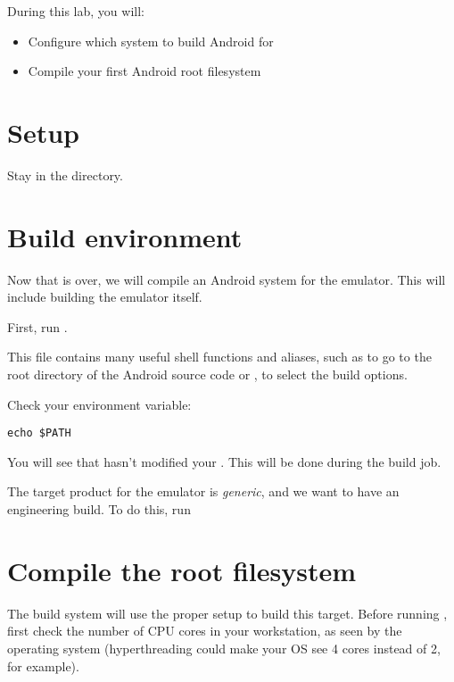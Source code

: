
During this lab, you will:
\begin{itemize}
  \item Configure which system to build Android for
  \item Compile your first Android root filesystem
\end{itemize}

\section{Setup}

Stay in the  directory.

\section{Build environment}

Now that  is over, we will compile an Android system for the
emulator. This will include building the emulator itself.

First, run .

This file contains many useful shell functions and aliases, such as  to
go to the root directory of the Android source code or , to select
the build options.

Check your  environment variable:

\begin{verbatim}
echo $PATH
\end{verbatim}

You will see that  hasn't modified your .
This will be done during the build job.

The target product for the emulator is {\it generic}, and we want to have an 
engineering build. To do this, run 

\section{Compile the root filesystem}

The build system will use the proper setup to build this target. Before running
, first check the number of CPU cores in your workstation, as seen by
the operating system (hyperthreading could make your OS see 4 cores instead of 2,
for example).


